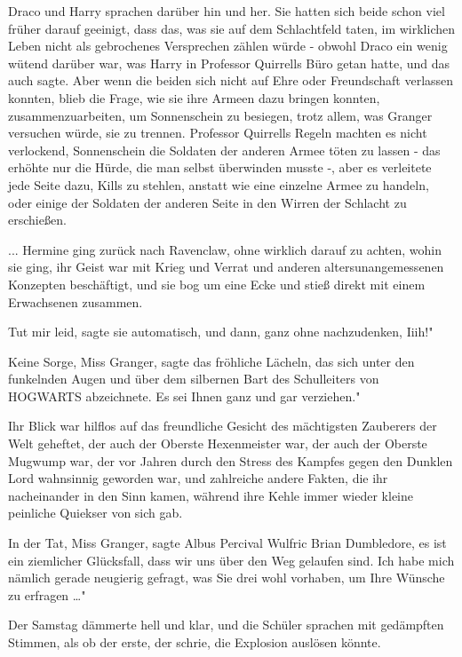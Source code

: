 Draco und Harry sprachen darüber hin und her. Sie hatten sich beide schon viel
früher darauf geeinigt, dass das, was sie auf dem Schlachtfeld taten, im
wirklichen Leben nicht als gebrochenes Versprechen zählen würde - obwohl Draco
ein wenig wütend darüber war, was Harry in Professor Quirrells Büro getan hatte,
und das auch sagte. Aber wenn die beiden sich nicht auf Ehre oder Freundschaft
verlassen konnten, blieb die Frage, wie sie ihre Armeen dazu bringen konnten,
zusammenzuarbeiten, um Sonnenschein zu besiegen, trotz allem, was Granger
versuchen würde, sie zu trennen. Professor Quirrells Regeln machten es nicht
verlockend, Sonnenschein die Soldaten der anderen Armee töten zu lassen - das
erhöhte nur die Hürde, die man selbst überwinden musste -, aber es verleitete
jede Seite dazu, Kills zu stehlen, anstatt wie eine einzelne Armee zu handeln,
oder einige der Soldaten der anderen Seite in den Wirren der Schlacht zu
erschießen.

... Hermine ging zurück nach Ravenclaw, ohne wirklich darauf zu achten, wohin
sie ging, ihr Geist war mit Krieg und Verrat und anderen altersunangemessenen
Konzepten beschäftigt, und sie bog um eine Ecke und stieß direkt mit einem
Erwachsenen zusammen.

\glqq Tut mir leid\grqq{}, sagte sie automatisch, und dann, ganz ohne
nachzudenken, \glqq Iiih!"

\glqq Keine Sorge, Miss Granger\grqq{}, sagte das fröhliche Lächeln, das sich
unter den funkelnden Augen und über dem silbernen Bart des Schulleiters von
HOGWARTS abzeichnete. \glqq Es sei Ihnen ganz und gar verziehen."

Ihr Blick war hilflos auf das freundliche Gesicht des mächtigsten Zauberers der
Welt geheftet, der auch der Oberste Hexenmeister war, der auch der Oberste
Mugwump war, der vor Jahren durch den Stress des Kampfes gegen den Dunklen Lord
wahnsinnig geworden war, und zahlreiche andere Fakten, die ihr nacheinander in
den Sinn kamen, während ihre Kehle immer wieder kleine peinliche Quiekser von
sich gab.

\glqq In der Tat, Miss Granger\grqq{}, sagte Albus Percival Wulfric Brian
Dumbledore, \glqq es ist ein ziemlicher Glücksfall, dass wir uns über den Weg
gelaufen sind. Ich habe mich nämlich gerade neugierig gefragt, was Sie drei wohl
vorhaben, um Ihre Wünsche zu erfragen …"

Der Samstag dämmerte hell und klar, und die Schüler sprachen mit gedämpften
Stimmen, als ob der erste, der schrie, die Explosion auslösen könnte.

